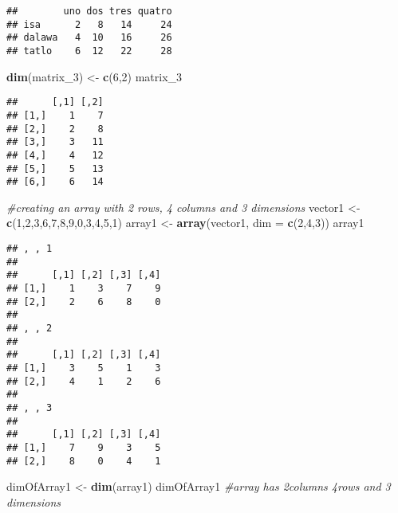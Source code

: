 \documentclass[
]{article}
\newenvironment{Shaded}{\begin{snugshade}}{\end{snugshade}}
\newcommand{\AttributeTok}[1]{\textcolor[rgb]{0.13,0.29,0.53}{#1}}
\newcommand{\CommentTok}[1]{\textcolor[rgb]{0.56,0.35,0.01}{\textit{#1}}}
\newcommand{\DecValTok}[1]{\textcolor[rgb]{0.00,0.00,0.81}{#1}}
\newcommand{\FunctionTok}[1]{\textcolor[rgb]{0.13,0.29,0.53}{\textbf{#1}}}
\newcommand{\NormalTok}[1]{#1}
\newcommand{\OtherTok}[1]{\textcolor[rgb]{0.56,0.35,0.01}{#1}}
\begin{document}
\begin{verbatim}
##        uno dos tres quatro
## isa      2   8   14     24
## dalawa   4  10   16     26
## tatlo    6  12   22     28
\end{verbatim}

\begin{Shaded}
\begin{Highlighting}[]
\FunctionTok{dim}\NormalTok{(matrix\_3) }\OtherTok{\textless{}{-}} \FunctionTok{c}\NormalTok{(}\DecValTok{6}\NormalTok{,}\DecValTok{2}\NormalTok{)}
\NormalTok{matrix\_3}
\end{Highlighting}
\end{Shaded}

\begin{verbatim}
##      [,1] [,2]
## [1,]    1    7
## [2,]    2    8
## [3,]    3   11
## [4,]    4   12
## [5,]    5   13
## [6,]    6   14
\end{verbatim}

\begin{Shaded}
\begin{Highlighting}[]
\CommentTok{\#creating an array with 2 rows, 4 columns and 3 dimensions}
\NormalTok{vector1 }\OtherTok{\textless{}{-}} \FunctionTok{c}\NormalTok{(}\DecValTok{1}\NormalTok{,}\DecValTok{2}\NormalTok{,}\DecValTok{3}\NormalTok{,}\DecValTok{6}\NormalTok{,}\DecValTok{7}\NormalTok{,}\DecValTok{8}\NormalTok{,}\DecValTok{9}\NormalTok{,}\DecValTok{0}\NormalTok{,}\DecValTok{3}\NormalTok{,}\DecValTok{4}\NormalTok{,}\DecValTok{5}\NormalTok{,}\DecValTok{1}\NormalTok{)}
\NormalTok{array1 }\OtherTok{\textless{}{-}} \FunctionTok{array}\NormalTok{(vector1, }\AttributeTok{dim =} \FunctionTok{c}\NormalTok{(}\DecValTok{2}\NormalTok{,}\DecValTok{4}\NormalTok{,}\DecValTok{3}\NormalTok{))}
\NormalTok{array1}
\end{Highlighting}
\end{Shaded}

\begin{verbatim}
## , , 1
## 
##      [,1] [,2] [,3] [,4]
## [1,]    1    3    7    9
## [2,]    2    6    8    0
## 
## , , 2
## 
##      [,1] [,2] [,3] [,4]
## [1,]    3    5    1    3
## [2,]    4    1    2    6
## 
## , , 3
## 
##      [,1] [,2] [,3] [,4]
## [1,]    7    9    3    5
## [2,]    8    0    4    1
\end{verbatim}

\begin{Shaded}
\begin{Highlighting}[]
\NormalTok{dimOfArray1 }\OtherTok{\textless{}{-}} \FunctionTok{dim}\NormalTok{(array1)}
\NormalTok{dimOfArray1 }\CommentTok{\#array has 2columns 4rows and 3 dimensions}
\end{Highlighting}
\end{Shaded}
\end{document}
